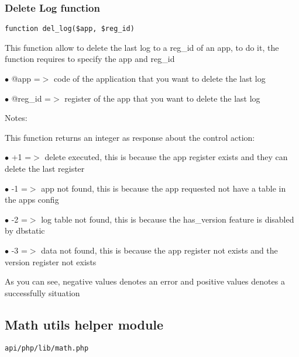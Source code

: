 \documentclass[a4paper]{article}
\begin{document}
\hypertarget{toc492}{}
\subsubsection{Delete Log function}

\begin{lstlisting}
function del_log($app, $reg_id)
\end{lstlisting}

This function allow to delete the last log to a reg\_id of an app, to do it,
the function requires to specify the app and reg\_id

\begin{compactitem}
\item[\color{myblue}$\bullet$] @app    =$>$ code of the application that you want to delete the last log
\item[\color{myblue}$\bullet$] @reg\_id =$>$ register of the app that you want to delete the last log
\end{compactitem}

Notes:

This function returns an integer as response about the control action:

\begin{compactitem}
\item[\color{myblue}$\bullet$] +1 =$>$ delete executed, this is because the app register exists and they can delete the last register
\item[\color{myblue}$\bullet$] -1 =$>$ app not found, this is because the app requested not have a table in the apps config
\item[\color{myblue}$\bullet$] -2 =$>$ log table not found, this is because the has\_version feature is disabled by dbstatic
\item[\color{myblue}$\bullet$] -3 =$>$ data not found, this is because the app register not exists and the version register not exists
\end{compactitem}

As you can see, negative values denotes an error and positive values denotes a successfully situation

\hypertarget{toc493}{}
\subsection{Math utils helper module}

\begin{lstlisting}
api/php/lib/math.php
\end{lstlisting}
\end{document}
